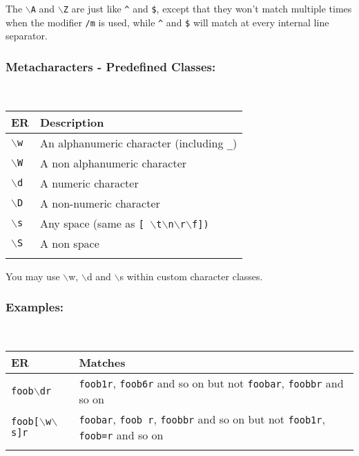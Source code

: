 The \texttt{$\backslash$A} and \texttt{$\backslash$Z} are just like
\texttt{\^{}} and \texttt{\$}, except that they won't match multiple
times when the modifier \texttt{/m} is used, while \texttt{\^{}} and
\texttt{\$} will match at every internal line separator.


\subsubsection{Metacharacters - Predefined Classes:}\\

\begin{footnotesize}
  \begin{tabularx}{\textwidth}{>{\hsize=0.3\hsize}X>{\hsize=0.7\hsize}X}\\
    \hline
    \textbf{ER} & \textbf{Description} \\
    \hline
    \texttt{$\backslash$w} & An alphanumeric character (including \texttt{\_}) \\
    \hline
    \texttt{$\backslash$W} & A non alphanumeric character \\
    \texttt{$\backslash$d} & A numeric character \\
    \texttt{$\backslash$D} & A non-numeric character \\
    \texttt{$\backslash$s} & Any space (same as \texttt{[ $\backslash$t$\backslash$n$\backslash$r$\backslash$f])} \\
    \texttt{$\backslash$S} & A non space \\
    \hline
    \\
  \end{tabularx}
\end{footnotesize}

You may use $\backslash$w, $\backslash$d and $\backslash$s within
custom character classes.


\subsubsection{Examples:}\\

\begin{footnotesize}
  \begin{tabularx}{\textwidth}{>{\hsize=0.2\hsize}X>{\hsize=0.9\hsize}X}\\
    \hline
    \textbf{ER} & \textbf{Matches} \\
    \hline
    \texttt{foob$\backslash$dr} & \texttt{foob1r}, \texttt{foob6r} and so on but not \texttt{foobar}, \texttt{foobbr} and so on \\
    \texttt{foob[$\backslash$w$\backslash$s]r} & \texttt{foobar}, \texttt{foob r}, \texttt{foobbr} and so on but not \texttt{foob1r}, \texttt{foob=r} and so on \\
    \hline
    \\
  \end{tabularx}
\end{footnotesize}

